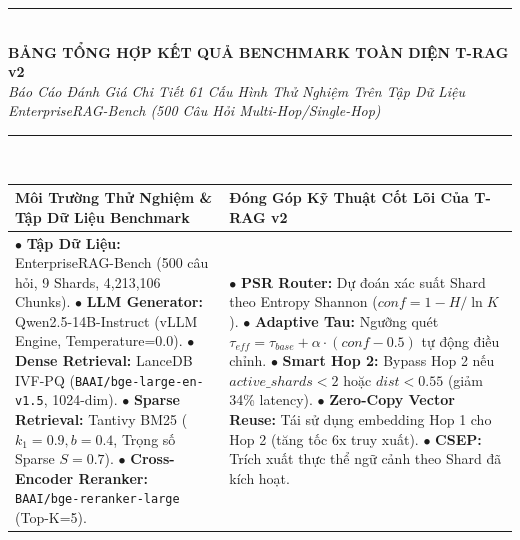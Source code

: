 \documentclass[a4paper,10pt]{article}
\begin{document}
\pagestyle{empty}

\centering

\vspace*{-0.3cm}
{\color{tragblue}\rule{\linewidth}{1.5pt}}\\[3pt]
{\Large\bfseries\color{tragblue} BẢNG TỔNG HỢP KẾT QUẢ BENCHMARK TOÀN DIỆN T-RAG v2}\\[2pt]
{\small\itshape Báo Cáo Đánh Giá Chi Tiết 61 Cấu Hình Thử Nghiệm Trên Tập Dữ Liệu EnterpriseRAG-Bench (500 Câu Hỏi Multi-Hop/Single-Hop)}\\[3pt]
{\color{tragblue}\rule{\linewidth}{0.6pt}}\\[3pt]

\vspace*{-0.1cm}
\begin{center}
\fontsize{7.2pt}{8.8pt}\selectfont
\begin{tabular}{|>{\raggedright\arraybackslash}p{9.4cm}|>{\raggedright\arraybackslash}p{9.4cm}|}
\hline
\rowcolor{gray!15} \textbf{Môi Trường Thử Nghiệm \& Tập Dữ Liệu Benchmark} & \textbf{Đóng Góp Kỹ Thuật Cốt Lõi Của T-RAG v2} \\ \hline
$\bullet$ \textbf{Tập Dữ Liệu:} EnterpriseRAG-Bench (500 câu hỏi, 9 Shards, 4,213,106 Chunks).\newline
$\bullet$ \textbf{LLM Generator:} Qwen2.5-14B-Instruct (vLLM Engine, Temperature=0.0).\newline
$\bullet$ \textbf{Dense Retrieval:} LanceDB IVF-PQ (\texttt{BAAI/bge-large-en-v1.5}, 1024-dim).\newline
$\bullet$ \textbf{Sparse Retrieval:} Tantivy BM25 ($k_1=0.9, b=0.4$, Trọng số Sparse $S=0.7$).\newline
$\bullet$ \textbf{Cross-Encoder Reranker:} \texttt{BAAI/bge-reranker-large} (Top-K=5).
&
$\bullet$ \textbf{PSR Router:} Dự đoán xác suất Shard theo Entropy Shannon ($conf = 1 - H/\ln K$).\newline
$\bullet$ \textbf{Adaptive Tau:} Ngưỡng quét $\tau_{eff} = \tau_{base} + \alpha \cdot (conf - 0.5)$ tự động điều chỉnh.\newline
$\bullet$ \textbf{Smart Hop 2:} Bypass Hop 2 nếu $active\_shards < 2$ hoặc $dist < 0.55$ (giảm 34\% latency).\newline
$\bullet$ \textbf{Zero-Copy Vector Reuse:} Tái sử dụng embedding Hop 1 cho Hop 2 (tăng tốc 6x truy xuất).\newline
$\bullet$ \textbf{CSEP:} Trích xuất thực thể ngữ cảnh theo Shard đã kích hoạt. \\ \hline
\end{tabular}
\end{center}
\end{document}
